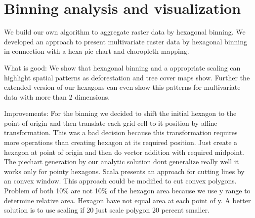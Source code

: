 	\section{Binning analysis and visualization}
		We build our own algorithm to aggregate raster data by hexagonal binning. We developed an approach to present multivariate raster data by hexagonal binning in connection with a hexa pie chart and choropleth mapping.

		What is good:
		We show that hexagonal binning and a appropriate scaling can highlight spatial patterns as deforestation and tree cover maps show. Further the extended version of our hexagons can even show this patterns for multivariate data with more than 2 dimensions.

		Improvements:
		For the binning we decided to shift the initial hexagon to the point of origin and then translate each grid cell to it position by affine transformation. This was a bad decision because this transformation requires more operations than creating hexagon at its required position. Just create a hexagon at point of origin and then do vector addition with required midpoint. The piechart generation by our analytic solution dont generalize really well it works only for pointy hexagons. Scala presents an approach for cutting lines by an convex window. This approach could be modified to cut convex polygons. Problem of both 10\% are not 10\% of the hexagon area because we use y range to determine relative area. Hexagon have not equal area at each point of y. A better solution is to use scaling if 20 just scale polygon 20 percent smaller.

